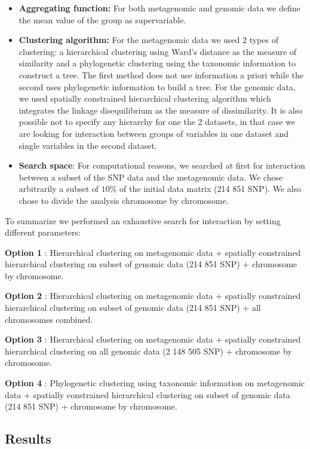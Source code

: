 \documentclass[]{book}
\begin{document}
\begin{itemize}
\item
  \textbf{Aggregating function:} For both metagenomic and genomic data we
  define the mean value of the group as supervariable.
\item
  \textbf{Clustering algorithm:} For the metagenomic data we used 2 types
  of clustering: a hierarchical clustering using Ward's distance as
  the measure of similarity and a phylogenetic clustering using the
  taxonomic information to construct a tree. The first method does not
  use information a priori while the second uses phylogenetic
  information to build a tree. For the genomic data, we used spatially
  constrained hierarchical clustering algorithm which integrates the
  linkage disequilibrium as the measure of dissimilarity. It is also
  possible not to specify any hierarchy for one the 2 datasets, in
  that case we are looking for interaction between groups of variables
  in one dataset and single variables in the second dataset.
\item
  \textbf{Search space}: For computational reasons, we searched at first
  for interaction between a subset of the SNP data and the metagenomic
  data. We chose arbitrarily a subset of \(10\%\) of the initial data
  matrix (214 851 SNP). We also chose to divide the analysis
  chromosome by chromosome.
\end{itemize}

To summarize we performed an exhaustive search for interaction by
setting different parameters:

\textbf{Option 1} : Hierarchical clustering on metagenomic data + spatially constrained hierarchical clustering on subset of genomic data (214 851 SNP) + chromosome by chromosome.

\textbf{Option 2} : Hierarchical clustering on metagenomic data + spatially constrained hierarchical clustering on subset of genomic data (214 851 SNP) + all chromosomes combined.

\textbf{Option 3} : Hierarchical clustering on metagenomic data + spatially constrained hierarchical clustering on all genomic data (2 148 505 SNP) + chromosome by chromosome.

\textbf{Option 4} : Phylogenetic clustering using taxonomic information on metagenomic data + spatially constrained hierarchical clustering on subset of genomic data (214 851 SNP) + chromosome by chromosome.

\hypertarget{results-1}{%
\subsection{Results}\label{results-1}}
\end{document}
